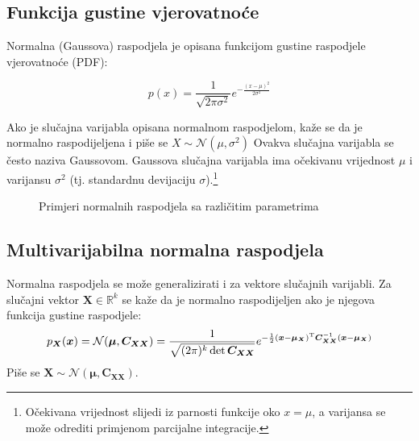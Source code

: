 \newcommand*{\vecrow}[2]{\left[\begin{array}{cc}#1&#2\end{array}\right]}
\newcommand*{\veccol}[2]{\left[\begin{array}{c}#1\\#2\end{array}\right]}

\subsection{Funkcija gustine vjerovatnoće}

Normalna (Gaussova) raspodjela je opisana funkcijom gustine raspodjele
vjerovatnoće (PDF):

\begin{equation} \label{eq:normal}
  p(x) = \frac{1}{\sqrt{2\pi\sigma^2}} e^{-\frac{(x-\mu)^2}{2\sigma^2}}
\end{equation}

Ako je slučajna varijabla opisana normalnom raspodjelom, kaže se da je normalno
raspodijeljena i piše se $X \sim \mathcal{N}(\mu,\sigma^2)$ Ovakva slučajna
varijabla se često naziva Gaussovom. Gaussova slučajna varijabla ima očekivanu
vrijednost $\mu$ i varijansu $\sigma^2$ (tj. standardnu devijaciju
$\sigma$).\footnote{Očekivana vrijednost slijedi iz parnosti funkcije oko
$x=\mu$, a varijansa se može odrediti primjenom parcijalne integracije.}

\begin{figure}[h]
  \centering
	\caption{Primjeri normalnih raspodjela sa različitim parametrima}
\end{figure}

\subsection{Multivarijabilna normalna raspodjela} \label{sec:gauss-multi}

Normalna raspodjela se može generalizirati i za vektore slučajnih varijabli.  Za
slučajni vektor $\bm X \in \mathbb{R}^k$ se kaže da je normalno raspodijeljen
ako je njegova funkcija gustine raspodjele:
%
\begin{equation} p_{\bm X}(\bm x) = \mathcal{N}(\bm\mu,\bm C_{\bm X\bm X}) =
\frac{1}{\sqrt{(2\pi)^k \det \bm C_{\bm X \bm X}}} e^{ -\frac{1}{2}(\bm x -
\bm\mu_{\bm X})^\text T \bm C_{\bm X \bm X}^{-1} (\bm x - \bm\mu_{\bm X}) }
\end{equation} Piše se $\bm X \sim \mathcal{N}(\bm\mu, \bm C_{\bm X\bm X})$.

